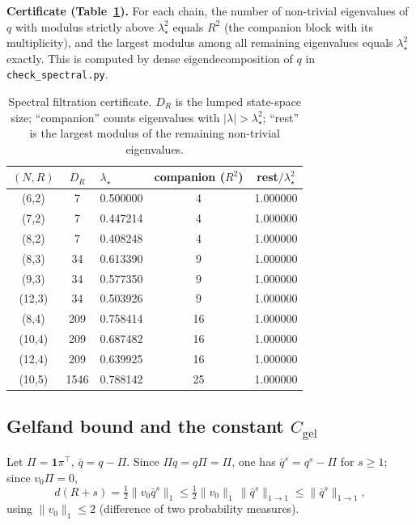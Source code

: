 \documentclass[twoside,11pt]{article}
\begin{document}
\textbf{Certificate (Table~\ref{tab:S3}).} For each chain, the
number of non-trivial eigenvalues of $q$ with modulus strictly above
$\lambda_\star^2$ equals $R^2$ (the companion block with its multiplicity), and the
largest modulus among all remaining eigenvalues equals $\lambda_\star^2$ exactly.
This is computed by dense eigendecomposition of $q$ in
\texttt{check\_spectral.py}.

\begin{table}[htbp]
\centering
\begin{tabular}{cclcc}
\toprule
$(N,R)$ & $D_R$ & $\lambda_\star$ & companion ($R^2$) & rest$/\lambda_\star^2$ \\
\midrule
(6,2) & 7 & 0.500000 & 4 & 1.000000 \\
(7,2) & 7 & 0.447214 & 4 & 1.000000 \\
(8,2) & 7 & 0.408248 & 4 & 1.000000 \\
(8,3) & 34 & 0.613390 & 9 & 1.000000 \\
(9,3) & 34 & 0.577350 & 9 & 1.000000 \\
(12,3) & 34 & 0.503926 & 9 & 1.000000 \\
(8,4) & 209 & 0.758414 & 16 & 1.000000 \\
(10,4) & 209 & 0.687482 & 16 & 1.000000 \\
(12,4) & 209 & 0.639925 & 16 & 1.000000 \\
(10,5) & 1546 & 0.788142 & 25 & 1.000000 \\
\bottomrule
\end{tabular}
\caption{Spectral filtration certificate. $D_R$ is the lumped state-space
size; ``companion'' counts eigenvalues with $|\lambda|>\lambda_\star^2$; ``rest'' is
the largest modulus of the remaining non-trivial eigenvalues.}
\label{tab:S3}

\end{table}
\subsection{\texorpdfstring{Gelfand bound and the constant $C_{\mathrm{gel}}$}{Gelfand bound and the constant C gel}}
\label{sec:S4}

Let $\Pi=\mathbf 1\pi^{\top}$, $\bar q=q-\Pi$. Since
$\Pi q=q\Pi=\Pi$, one has $\bar q^{s}=q^{s}-\Pi$ for $s\ge1$; since
$v_0\Pi=0$,
\begin{equation}\label{eq:S4-d}
d(R+s)=\tfrac12\|v_0\bar q^{s}\|_{1}
\le\tfrac12\|v_0\|_{1}\,\|\bar q^{s}\|_{1\to1}
\le\|\bar q^{s}\|_{1\to1},
\end{equation}
using $\|v_0\|_1\le2$ (difference of two probability measures).
\end{document}
